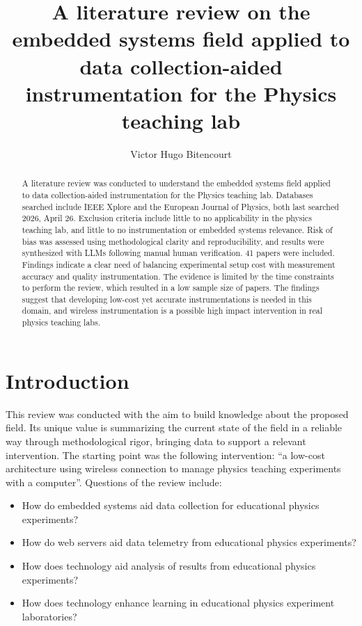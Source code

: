 \documentclass[12pt]{article}
\title{A literature review on the embedded systems field applied to data collection-aided instrumentation for the Physics teaching lab}
\author{Victor Hugo Bitencourt\inst{1}}
\begin{document}
 

\maketitle

\begin{abstract}
  A literature review was conducted to understand the embedded systems field applied to data collection-aided instrumentation for the Physics teaching lab. 
  Databases searched include IEEE Xplore and the European Journal of Physics, both last searched 2026, April 26.
  Exclusion criteria include little to no applicability in the physics teaching lab, and little to no instrumentation or embedded systems relevance.
  Risk of bias was assessed using methodological clarity and reproducibility, and results were synthesized with LLMs following manual human verification.
  41 papers were included.
  Findings indicate a clear need of balancing experimental setup cost with measurement accuracy and quality instrumentation.
  The evidence is limited by the time constraints to perform the review, which resulted in a low sample size of papers.
  The findings suggest that developing low-cost yet accurate instrumentations is needed in this domain, and wireless instrumentation is a possible high impact intervention in real physics teaching labs.
\end{abstract}

\section{Introduction}

This review was conducted with the aim to build knowledge about the proposed field.
Its unique value is summarizing the current state of the field in a reliable way through methodological rigor, bringing data to support a relevant intervention.
The starting point was the following intervention: ``a low-cost architecture using wireless connection to manage physics teaching experiments with a computer''.
Questions of the review include:

\begin{itemize}
  \item How do embedded systems aid data collection for educational physics experiments?
  \item How do web servers aid data telemetry from educational physics experiments?
  \item How does technology aid analysis of results from educational physics experiments?
  \item How does technology enhance learning in educational physics experiment laboratories?
\end{itemize}
\end{document}

